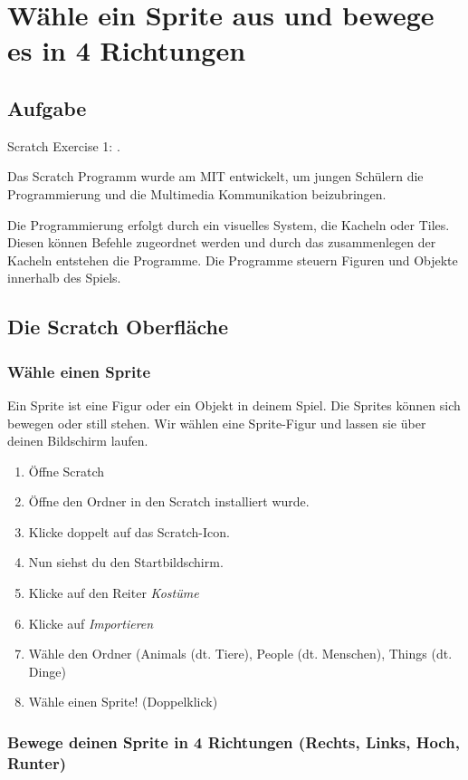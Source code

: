 \section{Wähle ein Sprite aus und bewege es in 4 Richtungen}
\subsection{Aufgabe}
Scratch Exercise 1: .

Das Scratch Programm wurde am MIT entwickelt, um jungen Schülern die Programmierung und die Multimedia Kommunikation beizubringen. 

Die Programmierung erfolgt durch ein visuelles System, die Kacheln oder Tiles. Diesen können Befehle zugeordnet werden und durch das zusammenlegen der Kacheln entstehen die Programme. Die Programme steuern Figuren und Objekte innerhalb des Spiels.


\subsection{Die Scratch Oberfläche}

\subsubsection{Wähle einen Sprite}

Ein Sprite ist eine Figur oder ein Objekt in deinem Spiel. Die Sprites können sich bewegen oder still stehen. Wir wählen eine Sprite-Figur und lassen sie über deinen Bildschirm laufen.
\begin{enumerate}
\item Öffne Scratch
\item Öffne den Ordner in den Scratch installiert wurde.
\item Klicke doppelt auf das Scratch-Icon.
\item Nun siehst du den Startbildschirm.
\item Klicke auf den Reiter \textit{Kostüme}
\item Klicke auf \textit{Importieren}
\item Wähle den Ordner (Animals (dt. Tiere), People (dt. Menschen), Things (dt. Dinge)
\item Wähle einen  Sprite! (Doppelklick)
\end{enumerate}

\subsubsection{Bewege deinen Sprite in 4 Richtungen (Rechts, Links, Hoch, Runter)}

